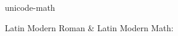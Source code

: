 \documentclass{article}
\begin{document}
unicode-math
\palette
\pagebreak

Latin Modern Roman \& Latin Modern Math:
\testme
\pagebreak
\testme[Bonum]
\pagebreak
\testme[Pagella]
\pagebreak
\testme[Schola]
\pagebreak

\testme[Termes]
\end{document}
